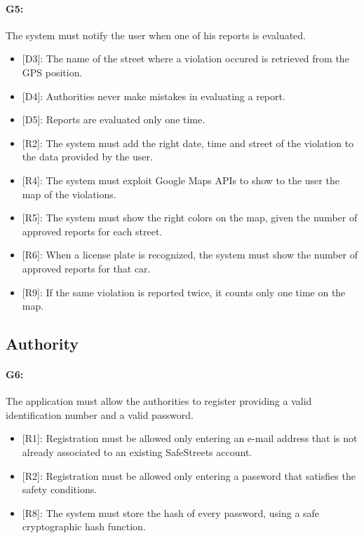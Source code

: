 \documentclass[12pt,a4paper]{report}
\begin{document}
			\paragraph {G5:} The system must notify the user when one of his reports is evaluated.
			\begin{itemize}
				\item{[D3]:} The name of the street where a violation occured is retrieved from the GPS position.
				\item{[D4]:} Authorities never make mistakes in evaluating a report.
				\item{[D5]:} Reports are evaluated only one time.
			\end{itemize}
			\begin{itemize}
				\item{[R2]:} The system must add the right date, time and street of the violation to the data provided by the user.
				\item{[R4]:} The system must exploit Google Maps APIs to show to the user the map of the violations.
				\item{[R5]:} The system must show the right colors on the map, given the number of approved reports for each street.
				\item{[R6]:} When a license plate is recognized, the system must show the number of approved reports for that car.
				\item{[R9]:} If the same violation is reported twice, it counts only one time on the map.
			\end{itemize}
			
		\subsection{Authority}
			
			\paragraph {G6:} The application must allow the authorities to register providing a valid identification number and a valid password.
				\begin{itemize}
					\item{[R1]:} Registration must be allowed only entering an e-mail address that is not already associated to an existing SafeStreets account.
					\item{[R2]:} Registration must be allowed only entering a password that satisfies the safety conditions.
					\item{[R8]:} The system must store the hash of every password, using a safe cryptographic hash function.
				\end{itemize}
\end{document}
